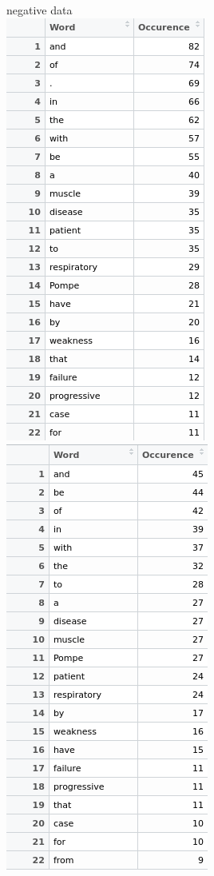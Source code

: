 \documentclass{article}
\begin{document}
 \newpage
negative data\\
 \includegraphics[width=0.6\linewidth]{word_occurence_neg.png}
 \includegraphics[width=0.6\linewidth]{word_occurence_neg_uni.png}\\
 
\end{document}
